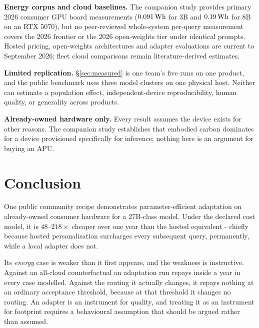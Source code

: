 \documentclass[conference]{IEEEtran}
\newcommand{\Wh}{\,\text{Wh}}
\begin{document}
\textbf{Energy corpus and cloud baselines.} The companion study provides primary
2026 consumer GPU board measurements ($\RtxThreeEnergy\Wh$ for 3B and $\RtxEightEnergy\Wh$ for 8B on
an RTX 5070), but no peer-reviewed whole-system per-query measurement covers
the 2026 frontier or the 2026 open-weights tier under identical prompts. Hosted
pricing, open-weights architectures and adapter evaluations are current to
September 2026; fleet cloud comparisons remain literature-derived estimates.

\textbf{Limited replication.} \S\ref{sec:measured} is one team's five runs on
one product, and the public benchmark uses three model clusters on one
physical host. Neither can estimate a population effect, independent-device
reproducibility, human quality, or generality across products.

\textbf{Already-owned hardware only.} Every result assumes the device exists for
other reasons. The companion study establishes that embodied carbon dominates
for a device provisioned specifically for inference; nothing here is an argument
for buying an APU.

\section{Conclusion}

One public community recipe demonstrates parameter-efficient adaptation on
already-owned consumer hardware for a 27B-class model. Under the declared
cost model, it is $48$--$218\times$ cheaper over one year than the hosted
equivalent - chiefly because hosted personalisation surcharges every
subsequent query, permanently, while a local adapter does not.

Its \emph{energy} case is weaker than it first appears, and the weakness is
instructive. Against an all-cloud counterfactual an adaptation run repays inside
a year in every case modelled. Against the routing it actually changes, it
repays nothing at an ordinary acceptance threshold, because at that threshold it
changes no routing. An adapter is an instrument for quality, and treating it as
an instrument for footprint requires a behavioural assumption that should be
argued rather than assumed.
\end{document}
